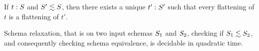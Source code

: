 


\begin{proposition}
\label{prop:schema-relaxation-flattening}
If $t: \ss$ and $\ss' \lesssim \ss$,
then there exists a unique $t': \ss'$ such that
every flattening of $t$ is a flattening of $t'$.
\end{proposition}

\begin{proposition}
\label{prop:schema-relaxation-decidable}
Schema relaxation, that is on two input schemas $\ss_1$ and $\ss_2$, checking if $\ss_1 \lesssim \ss_2$, and consequently checking schema equivalence, is decidable in quadratic time.
\end{proposition}

